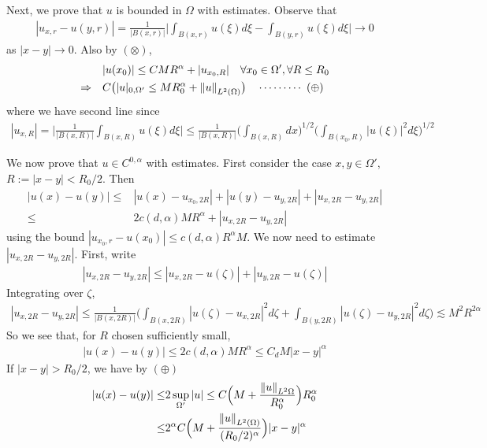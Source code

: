 \documentclass[12pt,a4paper]{article}
\newenvironment{proof}
{\begin{changemargin}{0.5cm}{0.5cm} 
	}%
	{\end{changemargin}
}
\newenvironment{p}
{\begin{proof} 
	}%
	{\end{proof}
}
\begin{document}
\begin{p}
Next, we prove that $u$ is bounded in $\Omega$ with estimates. Observe that 
\begin{align*}
|u_{x, r} - u(y, r)| = \frac{1}{|B(x,r)|} \Big| \int_{B(x,r)} u(\xi) d\xi - \int_{B(y, r)} u(\xi) d\xi \Big| \rightarrow 0
\end{align*}
as $|x-y| \rightarrow 0$. Also by $(\otimes)$,
\begin{align*}
& |u(x_0)| \leq CM R^{\alpha} + |u_{x_0, R}| \quad \forall x_0 \in \Omega', \forall R\leq R_0 \\
\Rightarrow \quad & C\big( |u|_{0, \Omega'} \leq MR_0^{\alpha} + \snorms{u}{L^2(\Omega)} \big) \call{\oplus}
\end{align*}
where we have second line since
\begin{align*}
|u_{x,R}| = \Big| \frac{1}{|B(x,R)|} \int_{B(x,R)} u(\xi) d\xi \Big| \leq \frac{1}{|B(x,R)|}\Big(\int_{B(x,R)} dx\Big)^{1/2} \Big(\int_{B(x_0, R)} |u(\xi)|^2 d\xi \Big)^{1/2}
\end{align*}
\s

We now prove that $u\in C^{0, \alpha}$ with estimates. First consider the case $x, y\in \Omega'$, $R:= |x-y| < R_0 /2$. Then
\begin{align*}
|u(x) - u(y)| \leq & |u(x)- u_{x_0, 2R}| + |u(y) - u_{y, 2R}| + |u_{x, 2R} - u_{y, 2R}| \\
\leq & 2c(d, \alpha) MR^{\alpha} + |u_{x, 2R} - u_{y, 2R}|
\end{align*}
using the bound $|u_{x_0, r} - u(x_0)| \leq c(d, \alpha) R^{\alpha}M$. We now need to estimate $|u_{x, 2R} - u_{y, 2R}|$. First, write
\begin{align*}
|u_{x, 2R} - u_{y, 2R}| \leq |u_{x, 2R} - u(\zeta)| + |u_{y, 2R} - u(\zeta)|
\end{align*}
Integrating over $\zeta$,
\begin{align*}
|u_{x,2R} - u_{y, 2R}| \leq \frac{1}{|B(x, 2R)|} \Big(\int_{B(x, 2R)} |u(\zeta) - u_{x, 2R}|^2 d\zeta + \int_{B(y, 2R)} |u(\zeta)- u_{y, 2R}|^2 d\zeta \Big) \lesssim  M^2 R^{2\alpha}
\end{align*}
So we see that, for $R$ chosen sufficiently small,
\begin{align*}
|u(x) - u(y)| \leq 2c(d, \alpha) MR^{\alpha} \leq C_d M |x-y|^{\alpha} 
\end{align*}
If $|x-y| > R_0/2$, we have by $(\oplus)$
\begin{align*}
|u(x)- u(y)| \leq & 2\sup_{\Omega'} |u| \leq C \Big(M + \frac{\snorms{u}{L^2{\Omega}}}{R_0^{\alpha}} \Big)R_0^{\alpha} \\
\leq & 2^{\alpha} C \Big(M + \frac{\snorms{u}{L^2(\Omega)}}{(R_0/2)^{\alpha}} \Big) |x-y|^{\alpha}
\end{align*}
\eop
\end{p}
\s
\end{document}
